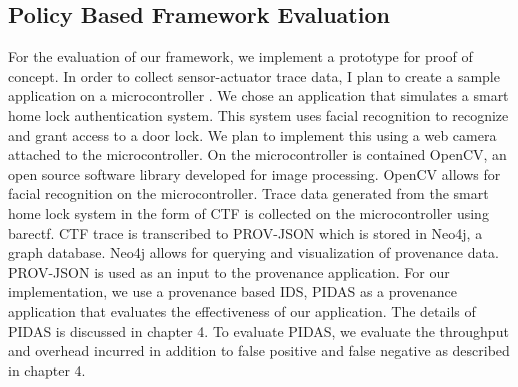 \subsection{Policy Based Framework Evaluation}

For the evaluation of our framework, we implement a prototype for proof of concept. In order to collect sensor-actuator trace data, I plan to create a sample application on a microcontroller . We chose an application that simulates a smart home lock authentication system. This system uses facial recognition to recognize and grant access to a door lock. We plan to implement this using a web camera attached to the microcontroller. On the microcontroller is contained OpenCV, an open source software library developed for image processing. OpenCV allows for facial recognition on the microcontroller. Trace data generated from the smart home lock system in the form of CTF  is collected on the microcontroller using barectf. CTF trace is transcribed to PROV-JSON which is stored in Neo4j, a graph database.  Neo4j allows for querying and visualization of provenance data. PROV-JSON is used as an input to the provenance application. For our implementation, we use a provenance based IDS, PIDAS as a provenance application that evaluates the effectiveness of our application. The details of PIDAS is discussed in chapter 4. To evaluate PIDAS, we evaluate the throughput and overhead incurred in addition to false positive and false negative as described in chapter 4.







%

